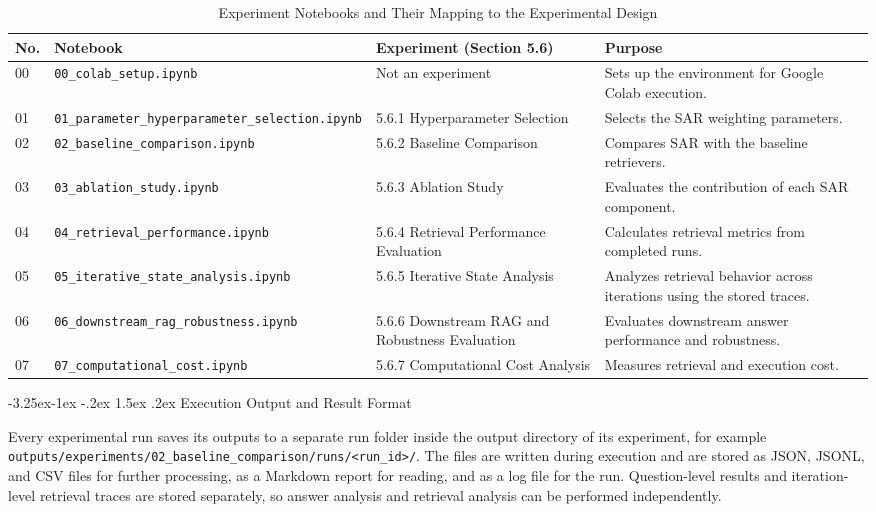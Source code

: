 \documentclass[12pt,a4paper]{report}
\makeatletter
\renewcommand\subsection{\@startsection{subsection}{2}{\z@}%
    {-3.25ex\@plus -1ex \@minus -.2ex}%
    {1.5ex \@plus .2ex}%
    {\normalfont\fontsize{14}{17}\selectfont\bfseries}}
\makeatother
\begin{document}
\begin{table}[H]
\centering
\caption{Experiment Notebooks and Their Mapping to the Experimental Design}
\label{tab:impl-notebooks}
\renewcommand{\arraystretch}{1.15}
\begin{tabular}{|p{0.35in}|p{2.2in}|p{1.45in}|p{2.0in}|}
\hline
\textbf{No.} & \textbf{Notebook} & \textbf{Experiment (Section 5.6)} & \textbf{Purpose} \\
\hline
00 & \texttt{00\_colab\_setup.ipynb} & Not an experiment & Sets up the environment for Google Colab execution. \\
\hline
01 & \texttt{01\_parameter\_\allowbreak hyperparameter\_\allowbreak selection.ipynb} & 5.6.1 Hyperparameter Selection & Selects the SAR weighting parameters. \\
\hline
02 & \texttt{02\_baseline\_\allowbreak comparison.ipynb} & 5.6.2 Baseline Comparison & Compares SAR with the baseline retrievers. \\
\hline
03 & \texttt{03\_ablation\_\allowbreak study.ipynb} & 5.6.3 Ablation Study & Evaluates the contribution of each SAR component. \\
\hline
04 & \texttt{04\_retrieval\_\allowbreak performance.ipynb} & 5.6.4 Retrieval Performance Evaluation & Calculates retrieval metrics from completed runs. \\
\hline
05 & \texttt{05\_iterative\_\allowbreak state\_\allowbreak analysis.ipynb} & 5.6.5 Iterative State Analysis & Analyzes retrieval behavior across iterations using the stored traces. \\
\hline
06 & \texttt{06\_downstream\_\allowbreak rag\_\allowbreak robustness.ipynb} & 5.6.6 Downstream RAG and Robustness Evaluation & Evaluates downstream answer performance and robustness. \\
\hline
07 & \texttt{07\_computational\_\allowbreak cost.ipynb} & 5.6.7 Computational Cost Analysis & Measures retrieval and execution cost. \\
\hline
\end{tabular}
\end{table}

\subsection{Execution Output and Result Format}

Every experimental run saves its outputs to a separate run folder inside the output directory of its experiment, for example \texttt{outputs/experiments/02\_baseline\_comparison/runs/<run\_id>/}. The files are written during execution and are stored as JSON, JSONL, and CSV files for further processing, as a Markdown report for reading, and as a log file for the run. Question-level results and iteration-level retrieval traces are stored separately, so answer analysis and retrieval analysis can be performed independently.
\end{document}
